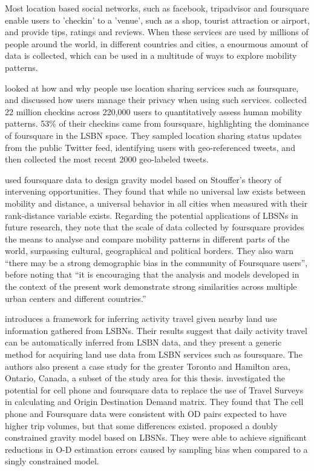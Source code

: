 Most location based social networks, such as facebook, tripadvisor and foursquare enable users to 'checkin' to a 'venue', such as a shop, tourist attraction or airport, and provide tips, ratings and reviews. When these services are used by millions of people around the world, in different countries and cities, a enourmous amount of data is collected, which can be used in a multitude of ways to explore mobility patterns. 

\textcite{lindqvist2011m} looked at how and why people use location sharing services such as foursquare, and discussed how users manage their privacy when using such services. \autocite{cheng2011exploring} collected 22 million checkins across 220,000 users to quantitatively assess human mobility patterns. 53\% of their checkins came from foursquare, highlighting the dominance of foursquare in the LSBN space. They sampled location sharing status updates from the public Twitter feed, identifying users with geo-referenced tweets, and then collected the most recent 2000 geo-labeled tweets.

\textcite{noulas2012tale} used foursquare data to design gravity model based on Stouffer's theory of intervening opportunities. They found that while no universal law exists between mobility and distance, a universal behavior in all cities when measured with their rank-distance variable exists. Regarding the potential applications of LBSNs in future research, they note that the scale of data collected by foursquare provides the means to analyse and compare mobility patterns in different parts of the world, surpassing cultural, geographical and political borders. They also warn \enquote{there may be a strong demographic bias in the community of Foursquare users}, before noting that \enquote{it is encouraging that the analysis and models developed in the context of the present work demonstrate strong similarities across multiple urban centers and different countries.}

\textcite{abdulazim2015framework} introduces a framework for inferring activity travel given nearby land use information gathered from LSBNs. Their results suggest that daily activity travel can be automatically inferred from LSBN data, and they present a generic method for acquiring land use data from LSBN services such as foursquare. The authors also present a case study for the  greater Toronto and Hamilton area, Ontario, Canada, a subset of the study area for this thesis.
\textcite{sa2015origin} investigated the potential for cell phone and foursquare data to replace the use of Travel Surveys in calculating and Origin Destination Demand matrix. They found that The cell phone and Foursquare data were consistent with OD pairs expected to have higher trip volumes, but that some differences existed.
\textcite{jin2014location} proposed a doubly constrained gravity model based on LBSNs. They were able to achieve significant reductions in O-D estimation errors caused by sampling bias when compared to a singly constrained model.

